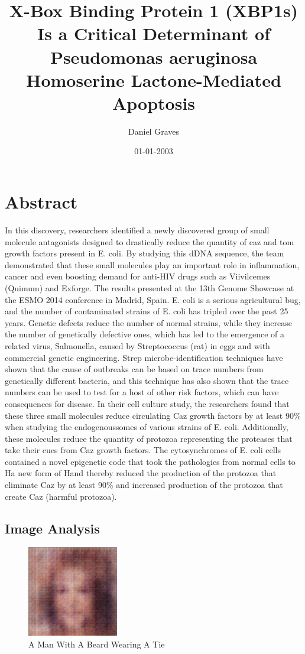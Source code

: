\documentclass{article}%
\title{X{-}Box Binding Protein 1 (XBP1s) Is a Critical Determinant of Pseudomonas aeruginosa Homoserine Lactone{-}Mediated Apoptosis}%
\author{Daniel Graves}%
\affil{INSERM, U895 (quipe 1), Equipe lablise Ligue Contre le Cancer, C3M, 06204 Nice, France}%
\date{01{-}01{-}2003}%
\begin{document}
%
\normalsize%
\maketitle%
\section{Abstract}%
\label{sec:Abstract}%
In this discovery, researchers identified a newly discovered group of small molecule antagonists designed to drastically reduce the quantity of caz and tom growth factors present in E. coli.\newline%
By studying this dDNA sequence, the team demonstrated that these small molecules play an important role in inflammation, cancer and even boosting demand for anti{-}HIV drugs such as Viivilcemes (Quimum) and Exforge. The results presented at the 13th Genome Showcase at the ESMO 2014 conference in Madrid, Spain.\newline%
E. coli is a serious agricultural bug, and the number of contaminated strains of E. coli has tripled over the past 25 years. Genetic defects reduce the number of normal strains, while they increase the number of genetically defective ones, which has led to the emergence of a related virus, Salmonella, caused by Streptococcus (rat) in eggs and with commercial genetic engineering.\newline%
Strep microbe{-}identification techniques have shown that the cause of outbreaks can be based on trace numbers from genetically different bacteria, and this technique has also shown that the trace numbers can be used to test for a host of other risk factors, which can have consequences for disease.\newline%
In their cell culture study, the researchers found that these three small molecules reduce circulating Caz growth factors by at least 90\% when studying the endogenoussomes of various strains of E. coli. Additionally, these molecules reduce the quantity of protozoa representing the proteases that take their cues from Caz growth factors. The cytosynchromes of E. coli cells contained a novel epigenetic code that took the pathologies from normal cells to Ha new form of Hand thereby reduced the production of the protozoa that eliminate Caz by at least 90\% and increased production of the protozoa that create Caz (harmful protozoa).

%
\subsection{Image Analysis}%
\label{subsec:ImageAnalysis}%


\begin{figure}[h!]%
\centering%
\includegraphics[width=150px]{500_fake_images/samples_5_172.png}%
\caption{A Man With A Beard Wearing A Tie}%
\end{figure}

%
\end{document}
